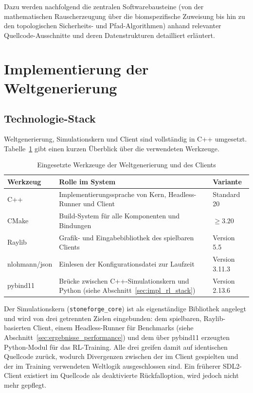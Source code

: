 \documentclass[
  a4paper,
  11pt,
  twoside,
  BCOR=8mm,           %
  headings=big,
  numbers=noenddot,
  listof=totoc,       %
  captions=tableheading,
]{scrreprt}
\begin{document}
Dazu werden nachfolgend die zentralen Softwarebausteine (von der mathematischen Rauscherzeugung über die biomspezifische Zuweisung bis hin zu den topologischen Sicherheits- und Pfad-Algorithmen) anhand relevanter Quellcode-Ausschnitte und deren Datenstrukturen detailliert erläutert.

\section{Implementierung der Weltgenerierung}

\subsection{Technologie-Stack}
\label{sec:umsetzung_stack}
Weltgenerierung, Simulationskern und Client sind vollständig in C++ umgesetzt. Tabelle~\ref{tab:world_stack} gibt einen kurzen Überblick über die verwendeten Werkzeuge.

\begin{table}[htbp]
    \centering
    \caption{Eingesetzte Werkzeuge der Weltgenerierung und des Clients}
    \label{tab:world_stack}
    \begin{tabular}{p{3.4cm}p{6.6cm}p{3.4cm}}
        \toprule
        \textbf{Werkzeug} & \textbf{Rolle im System} & \textbf{Variante} \\
        \midrule
        C++ & Implementierungssprache von Kern, Headless-Runner und Client & Standard 20 \\
        CMake & Build-System für alle Komponenten und Bindungen & $\ge 3.20$ \\
        Raylib & Grafik- und Eingabebibliothek des spielbaren Clients & Version 5.5 \\
        nlohmann/json & Einlesen der Konfigurationsdatei zur Laufzeit & Version 3.11.3 \\
        pybind11 & Brücke zwischen C++-Simulationskern und Python (siehe Abschnitt~\ref{sec:impl_rl_stack}) & Version 2.13.6 \\
        \bottomrule
    \end{tabular}
\end{table}

Der Simulationskern (\texttt{stoneforge\_core}) ist als eigenständige Bibliothek angelegt und wird von drei getrennten Zielen eingebunden: dem spielbaren, Raylib-basierten Client, einem Headless-Runner für Benchmarks (siehe Abschnitt~\ref{sec:ergebnisse_performance}) und dem über pybind11 erzeugten Python-Modul für das RL-Training. Alle drei greifen damit auf identischen Quellcode zurück, wodurch Divergenzen zwischen der im Client gespielten und der im Training verwendeten Weltlogik ausgeschlossen sind. Ein früherer SDL2-Client existiert im Quellcode als deaktivierte Rückfalloption, wird jedoch nicht mehr gepflegt.
\end{document}
